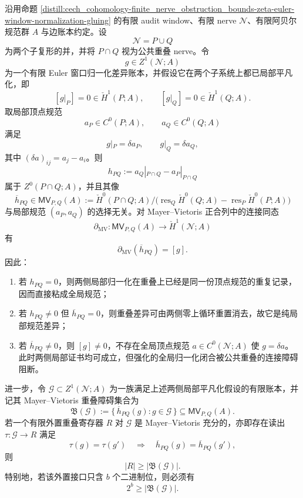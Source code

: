 \begin{theorem}\label{distill:cech_cohomology-mayer_vietoris_budget_transfer-zeta-euler-window-two-piece-overlap-budget}
沿用命题 \ref{distill:cech_cohomology-finite_nerve_obstruction_bounds-zeta-euler-window-normalization-gluing} 的有限 audit window、有限 nerve \(\mathcal N\)、有限阿贝尔规范群 \(A\) 与边账本约定。设
\[
\mathcal N=P\cup Q
\]
为两个子复形的并，并将 \(P\cap Q\) 视为公共重叠 nerve。令
\[
g\in Z^1(\mathcal N;A)
\]
为一个有限 Euler 窗口归一化差异账本，并假设它在两个子系统上都已局部平凡化，即
\[
[g|_P]=0\in \check H^1(P;A),
\qquad
[g|_Q]=0\in \check H^1(Q;A).
\]
取局部顶点规范
\[
a_P\in C^0(P;A),\qquad a_Q\in C^0(Q;A)
\]
满足
\[
g|_P=\delta a_P,
\qquad
 g|_Q=\delta a_Q,
\]
其中 \((\delta a)_{ij}=a_j-a_i\)。则
\[
h_{PQ}:=a_Q|_{P\cap Q}-a_P|_{P\cap Q}
\]
属于 \(Z^0(P\cap Q;A)\)，并且其像
\[
\overline h_{PQ}\in
\mathsf{MV}_{P,Q}(A)
:=
\check H^0(P\cap Q;A)\Big/
\bigl(\operatorname{res}_Q\check H^0(Q;A)-\operatorname{res}_P\check H^0(P;A)\bigr)
\]
与局部规范 \((a_P,a_Q)\) 的选择无关。对 Mayer--Vietoris 正合列中的连接同态
\[
\partial_{\mathrm{MV}}:\mathsf{MV}_{P,Q}(A)\longrightarrow \check H^1(\mathcal N;A)
\]
有
\[
\boxed{\;\partial_{\mathrm{MV}}(\overline h_{PQ})=[g].\;}
\]
因此：
\begin{enumerate}
\normalfont
  \item 若 \(h_{PQ}=0\)，则两侧局部归一化在重叠上已经是同一份顶点规范的重复记录，因而直接粘成全局规范；
  \item 若 \(h_{PQ}\ne0\) 但 \(\overline h_{PQ}=0\)，则重叠差异可由两侧零上循环重置消去，故它是纯局部规范差异；
  \item 若 \(\overline h_{PQ}\ne0\)，则 \([g]\ne0\)，不存在全局顶点规范 \(a\in C^0(\mathcal N;A)\) 使 \(g=\delta a\)。此时两侧局部证书均可成立，但强化的全局归一化闭合被公共重叠的连接障碍阻断。
\end{enumerate}
进一步，令 \(\mathscr G\subset Z^1(\mathcal N;A)\) 为一族满足上述两侧局部平凡化假设的有限账本，并记其 Mayer--Vietoris 重叠障碍集合为
\[
\mathfrak B(\mathscr G):=\{\,\overline h_{PQ}(g):g\in\mathscr G\,\}\subseteq \mathsf{MV}_{P,Q}(A).
\]
若一个有限外置重叠寄存器 \(R\) 对 \(\mathscr G\) 是 Mayer--Vietoris 充分的，亦即存在读出 \(\tau:\mathscr G\to R\) 满足
\[
\tau(g)=\tau(g')\quad\Longrightarrow\quad
\overline h_{PQ}(g)=\overline h_{PQ}(g'),
\]
则
\[
\boxed{\;|R|\ge |\mathfrak B(\mathscr G)|.\;}
\]
特别地，若该外置接口只含 \(b\) 个二进制位，则必须有
\[
2^b\ge |\mathfrak B(\mathscr G)|.
\]
\end{theorem}
